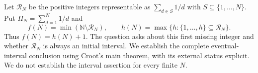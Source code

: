 Let $\mathcal R_N$ be the positive integers representable as $\sum_{d\in S}1/d$ with $S\subseteq\{1,\ldots,N\}$. Put $H_N=\sum_{d=1}^N1/d$ and
\[
 f(N)=\min(\mathbb N\setminus\mathcal R_N),\qquad
 h(N)=\max\{h:\{1,\ldots,h\}\subseteq\mathcal R_N\}.
\]
Thus $f(N)=h(N)+1$. The question asks about this first missing integer and whether $\mathcal R_N$ is always an initial interval. We establish the complete eventual-interval conclusion using Croot's main theorem, with its external status explicit. We do not establish the interval assertion for every finite $N$.
